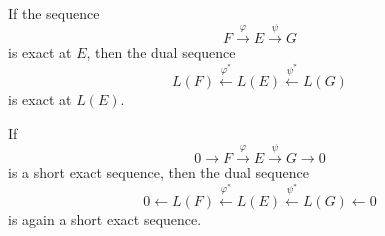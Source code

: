 If the sequence
$$F \xrightarrow{\varphi} E \xrightarrow{\psi} G$$
is exact at $E$, then the dual sequence
$$L(F) \xleftarrow{\varphi^*} L(E) \xleftarrow{\psi^*} L(G)$$
is exact at $L(E)$.

If
$$0 \to F \xrightarrow{\varphi} E \xrightarrow{\psi} G \to 0$$
is a short exact sequence, then the dual sequence
$$0 \leftarrow L(F) \xleftarrow{\varphi^*} L(E) \xleftarrow{\psi^*} L(G) \leftarrow 0$$
is again a short exact sequence.
